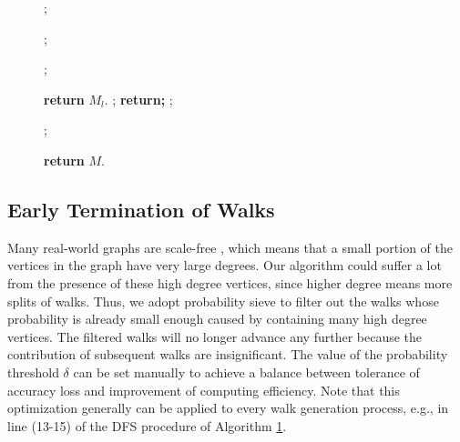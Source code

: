 \documentclass[conference]{IEEEtran}
\theoremstyle{definition}
\theoremstyle{definition}
\begin{document}
\begin{figure}
\begin{algorithm}[H]
\label{alg:two}
\begin{algorithmic}[1]
		;
				
						\State \parbox[t]{\dimexpr\linewidth-\algorithmicindent} {;}	
					\Else 
								\State \parbox[t]{\dimexpr\linewidth-\algorithmicindent}{;}
							\EndFor
						\EndFor
					\EndIf			
				
			\EndFor
	\EndFor
	\State \textbf{return} $M_l$.
\EndProcedure
{}
	;
		\State \textbf{return;} 
	\EndIf
		;   %
	\Else
			\State \parbox[t]{\dimexpr\linewidth-\algorithmicindent} {;}
		\EndFor
	\EndIf
	\State \textbf{return} $M$.
\EndProcedure
\end{algorithmic}
\end{algorithm}
\end{figure}
\subsection{Early Termination of Walks}
Many real-world graphs are scale-free \cite{li2005towards}, which means that a small portion of the vertices in the graph have very large degrees. 
Our algorithm could suffer a lot from the presence of these high degree vertices, since higher degree means more splits of walks.
Thus, we adopt probability sieve \cite{lizorkin2008accuracy} to filter out the walks  whose probability is already small enough caused by containing many high degree vertices.
The filtered walks will no longer advance any further because the contribution of subsequent walks are  insignificant. 
The value of the probability threshold $\delta$ can be set manually to achieve a balance between tolerance of accuracy loss and improvement of computing efficiency.
Note that this optimization generally can be applied to every walk generation process, e.g.,  in line (13-15) of the DFS procedure of Algorithm \ref{alg:two}.
\end{document}

